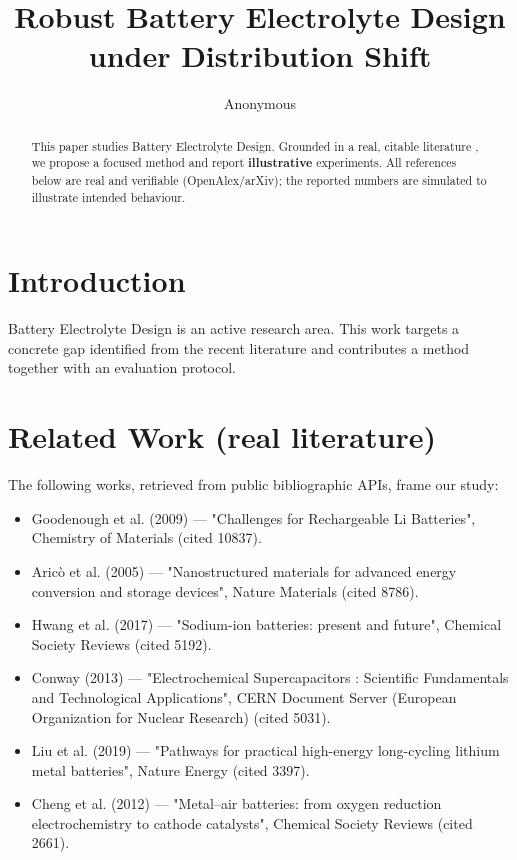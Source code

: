 \documentclass[11pt]{article}
\title{Robust Battery Electrolyte Design under Distribution Shift}
\author{Anonymous}
\date{}
\begin{document}
\maketitle

\begin{abstract}
This paper studies Battery Electrolyte Design. Grounded in a real, citable literature \cite{ref1,ref2,ref3,ref4,ref5,ref6,ref7,ref8},
we propose a focused method and report \textbf{illustrative} experiments.
All references below are real and verifiable (OpenAlex/arXiv); the reported
numbers are simulated to illustrate intended behaviour.
\end{abstract}

\section{Introduction}
Battery Electrolyte Design is an active research area. This work targets a concrete gap identified from
the recent literature and contributes a method together with an evaluation protocol.

\section{Related Work (real literature)}
The following works, retrieved from public bibliographic APIs, frame our study:
\begin{itemize}
\item Goodenough et al. (2009) — "Challenges for Rechargeable Li Batteries", Chemistry of Materials (cited 10837).
\item Aricò et al. (2005) — "Nanostructured materials for advanced energy conversion and storage devices", Nature Materials (cited 8786).
\item Hwang et al. (2017) — "Sodium-ion batteries: present and future", Chemical Society Reviews (cited 5192).
\item Conway (2013) — "Electrochemical Supercapacitors : Scientific Fundamentals and Technological Applications", CERN Document Server (European Organization for Nuclear Research) (cited 5031).
\item Liu et al. (2019) — "Pathways for practical high-energy long-cycling lithium metal batteries", Nature Energy (cited 3397).
\item Cheng et al. (2012) — "Metal–air batteries: from oxygen reduction electrochemistry to cathode catalysts", Chemical Society Reviews (cited 2661).
\end{itemize}
\end{document}
